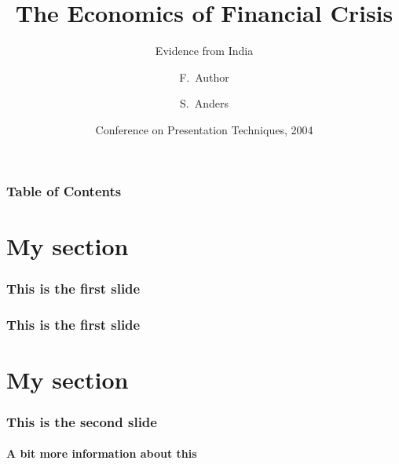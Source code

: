 \documentclass{beamer}
\title[Crisis] %
{The Economics of Financial Crisis}
\subtitle{Evidence from India}
\author[Author, Anders] %
{F.~Author\inst{1} \and S.~Anders\inst{2}}
\institute[Universities Here and There] %
{
  \inst{1}%
  Institute of Computer Science\\
  University Here
  \and
  \inst{2}%
  Institute of Theoretical Philosophy\\
  University There
}
\date[KPT 2004] %
{Conference on Presentation Techniques, 2004}
\begin{document}
\begin{frame}
    \titlepage
\end{frame}
\begin{frame}
    \frametitle{Table of Contents}
    \tableofcontents[currentsection]
\end{frame}
\section[Section]{My section}
\begin{frame}
    \frametitle{This is the first slide}
\end{frame}
\begin{frame}
    \frametitle{This is the first slide}
\end{frame}
\section[Section]{My section}
\begin{frame}
    \frametitle{This is the second slide}
    \framesubtitle{A bit more information about this}
\end{frame}
\end{document}

